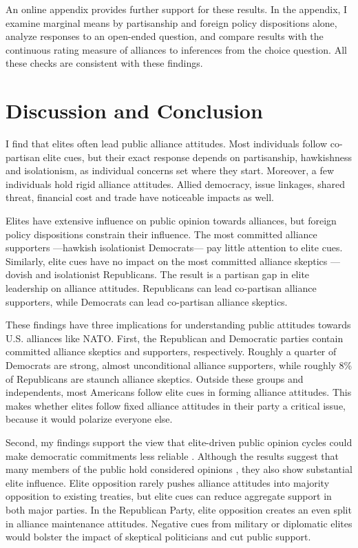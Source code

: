 \documentclass[12pt]{article}
\begin{document}
An online appendix provides further support for these results. 
In the appendix, I examine marginal means by partisanship and foreign policy dispositions alone, analyze responses to an open-ended question, and compare results with the continuous rating measure of alliances to inferences from the choice question.
All these checks are consistent with these findings. 


\section{Discussion and Conclusion} 


I find that elites often lead public alliance attitudes.  
Most individuals follow co-partisan elite cues, but their exact response depends on partisanship, hawkishness and isolationism, as individual concerns set where they start.
Moreover, a few individuals hold rigid alliance attitudes. 
Allied democracy, issue linkages, shared threat, financial cost and trade have noticeable impacts as well.  


Elites have extensive influence on public opinion towards alliances, but foreign policy dispositions constrain their influence. 
The most committed alliance supporters ---hawkish isolationist Democrats--- pay little attention to elite cues.
Similarly, elite cues have no impact on the most committed alliance skeptics --- dovish and isolationist Republicans. 
The result is a partisan gap in elite leadership on alliance attitudes. 
Republicans can lead co-partisan alliance supporters, while Democrats can lead co-partisan alliance skeptics. 


These findings have three implications for understanding public attitudes towards U.S. alliances like NATO. 
First, the Republican and Democratic parties contain committed alliance skeptics and supporters, respectively.
Roughly a quarter of Democrats are strong, almost unconditional alliance supporters, while roughly 8\% of Republicans are staunch alliance skeptics.
Outside these groups and independents, most Americans follow elite cues in forming alliance attitudes. 
This makes whether elites follow fixed alliance attitudes in their party a critical issue, because it would polarize everyone else.  


Second, my findings support the view that elite-driven public opinion cycles could make democratic commitments less reliable \citep{GartzkeGleditsch2004}. 
Although the results suggest that many members of the public hold considered opinions \citep{PageShapiro1992}, they also show substantial elite influence. 
Elite opposition rarely pushes alliance attitudes into majority opposition to existing treaties, but elite cues can reduce aggregate support in both major parties.
In the Republican Party, elite opposition creates an even split in alliance maintenance attitudes. 
Negative cues from military or diplomatic elites would bolster the impact of skeptical politicians and cut public support. 
\end{document}
